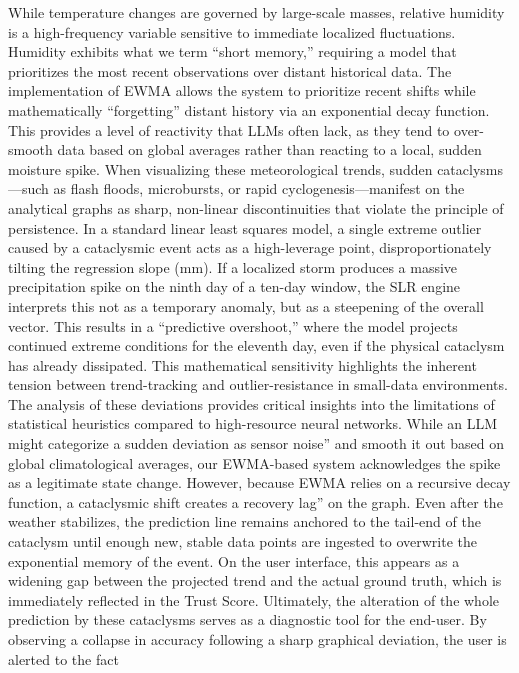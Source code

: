 \documentclass[14pt]{extarticle}
\begin{document}
\noindent While temperature changes are governed by large-scale masses, relative humidity is a high-frequency variable sensitive to immediate localized fluctuations. Humidity exhibits what we term ``short memory,'' requiring a model that prioritizes the most recent observations over distant historical data. The implementation of EWMA allows the system to prioritize recent shifts while mathematically ``forgetting'' distant history via an exponential decay function. This provides a level of reactivity that LLMs often lack, as they tend to over-smooth data based on global averages rather than reacting to a local, sudden moisture spike.
\noindent When visualizing these meteorological trends, sudden cataclysms---such
as flash floods, microbursts, or rapid cyclogenesis---manifest on the analytical
graphs as sharp, non-linear discontinuities that violate the principle of
persistence. In a standard linear least squares model, a single extreme outlier
caused by a cataclysmic event acts as a high-leverage point, disproportionately
tilting the regression slope (mm). If a localized storm produces a massive precipitation spike on the ninth day
of a ten-day window, the SLR engine interprets this not as a temporary anomaly,
but as a steepening of the overall vector. This results in a ``predictive
overshoot,'' where the model projects continued extreme conditions for the
eleventh day, even if the physical cataclysm has already dissipated. This
mathematical sensitivity highlights the inherent tension between trend-tracking
and outlier-resistance in small-data environments.
\noindent The analysis of these deviations provides critical insights into the
limitations of statistical heuristics compared to high-resource neural networks.
While an LLM might categorize a sudden deviation as sensor noise'' and smooth it
out based on global climatological averages, our EWMA-based system acknowledges
the spike as a legitimate state change. However, because EWMA relies on a
recursive decay function, a cataclysmic shift creates a recovery lag'' on the
graph. Even after the weather stabilizes, the prediction line remains anchored
to the tail-end of the cataclysm until enough new, stable data points are
ingested to overwrite the exponential memory of the event. On the user interface,
this appears as a widening gap between the projected trend and the actual
ground truth, which is immediately reflected in the Trust Score.
\noindent Ultimately, the alteration of the whole prediction by these cataclysms
serves as a diagnostic tool for the end-user. By observing a collapse in
accuracy following a sharp graphical deviation, the user is alerted to the fact
\end{document}
